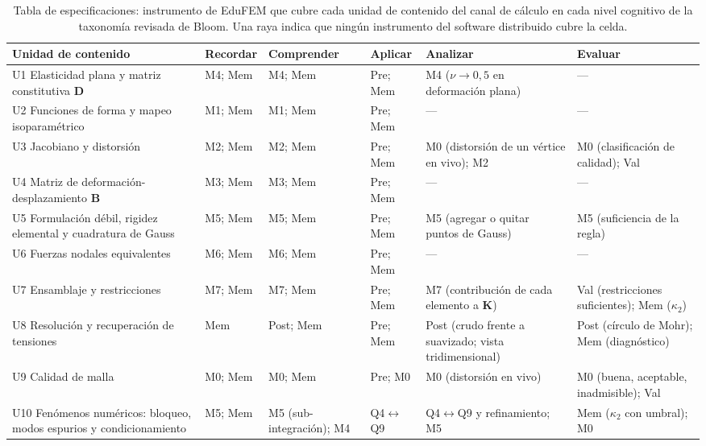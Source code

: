 \begin{table}[htbp]
\centering
\caption[Tabla de especificaciones: unidades de contenido del canal de cálculo por nivel cognitivo e instrumento de EduFEM.]{Tabla de especificaciones: instrumento de EduFEM que cubre cada unidad de contenido del canal de cálculo en cada nivel cognitivo de la taxonomía revisada de Bloom. Una raya indica que ningún instrumento del software distribuido cubre la celda.}
\label{tab:especificaciones}
{\footnotesize
\setlength{\tabcolsep}{3pt}
\renewcommand{\arraystretch}{1.15}
\begin{tabular}{@{}>{\raggedright\arraybackslash}p{3.5cm}>{\raggedright\arraybackslash}p{1.8cm}>{\raggedright\arraybackslash}p{2.2cm}>{\raggedright\arraybackslash}p{2.1cm}>{\raggedright\arraybackslash}p{2.5cm}>{\raggedright\arraybackslash}p{2.5cm}@{}}
\toprule
\textbf{Unidad de contenido} & \textbf{Recordar} & \textbf{Comprender} & \textbf{Aplicar} & \textbf{Analizar} & \textbf{Evaluar} \\
\midrule
U1 Elasticidad plana y matriz constitutiva $\bm{D}$ & M4; Mem & M4; Mem & Pre; Mem & M4 ($\nu \to 0{,}5$ en deformación plana) & --- \\
U2 Funciones de forma y mapeo isoparamétrico & M1; Mem & M1; Mem & Pre; Mem & --- & --- \\
U3 Jacobiano y distorsión & M2; Mem & M2; Mem & Pre; Mem & M0 (distorsión de un vértice en vivo); M2 & M0 (clasificación de calidad); Val \\
U4 Matriz de deformación-desplazamiento $\bm{B}$ & M3; Mem & M3; Mem & Pre; Mem & --- & --- \\
U5 Formulación débil, rigidez elemental y cuadratura de Gauss & M5; Mem & M5; Mem & Pre; Mem & M5 (agregar o quitar puntos de Gauss) & M5 (suficiencia de la regla) \\
U6 Fuerzas nodales equivalentes & M6; Mem & M6; Mem & Pre; Mem & --- & --- \\
U7 Ensamblaje y restricciones & M7; Mem & M7; Mem & Pre; Mem & M7 (contribución de cada elemento a $\bm{K}$) & Val (restricciones suficientes); Mem ($\kappa_2$) \\
U8 Resolución y recuperación de tensiones & Mem & Post; Mem & Pre; Mem & Post (crudo frente a suavizado; vista tridimensional) & Post (círculo de Mohr); Mem (diagnóstico) \\
U9 Calidad de malla & M0; Mem & M0; Mem & Pre; M0 & M0 (distorsión en vivo) & M0 (buena, aceptable, inadmisible); Val \\
U10 Fenómenos numéricos: bloqueo, modos espurios y condicionamiento & M5; Mem & M5 (sub-integración); M4 & Q4$\leftrightarrow$Q9 & Q4$\leftrightarrow$Q9 y refinamiento; M5 & Mem ($\kappa_2$ con umbral); M0 \\

\end{tabular}}
\end{table}
